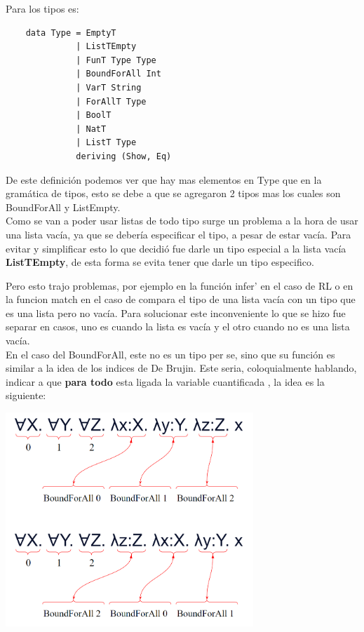 \documentclass[12pt, titlepage, a4paper]{article}
\begin{document}
\noindent Para los tipos es:
\begin{verbatim}
    data Type = EmptyT 
              | ListTEmpty
              | FunT Type Type
              | BoundForAll Int
              | VarT String
              | ForAllT Type
              | BoolT
              | NatT
              | ListT Type
              deriving (Show, Eq)
\end{verbatim}

De este definición podemos ver que hay mas elementos en Type que en la gramática de tipos, esto se debe a que se agregaron 2 tipos mas
los cuales son BoundForAll y ListEmpty. \\

Como se van a poder usar listas de todo tipo surge un problema a la hora de usar una lista vacía, ya que se debería especificar el tipo, 
a pesar de estar vacía. 
Para evitar y simplificar esto lo que decidió fue darle un tipo especial a la lista vacía \textbf{ListTEmpty}, de esta forma se evita 
tener que darle un tipo especifico.

Pero esto trajo problemas, por ejemplo en la función infer' en el caso de RL o en la funcion match en el caso de compara el tipo de una lista vacía con un tipo que es 
una lista pero no vacía. Para solucionar este inconveniente lo que se hizo fue separar en casos, uno es cuando la lista es 
vacía y el otro cuando no es una lista vacía.\\

En el caso del BoundForAll, este no es un tipo per se, sino que su función es similar a la idea 
de los indices de De Brujin. Este seria, coloquialmente hablando, indicar a que \textbf{para todo} esta ligada la variable cuantificada , la idea es la siguiente:

\begin{center}
    \includegraphics[width=0.7\textwidth]{Imagenes/EjemploBoundForAll.png}
\end{center}
\end{document}
